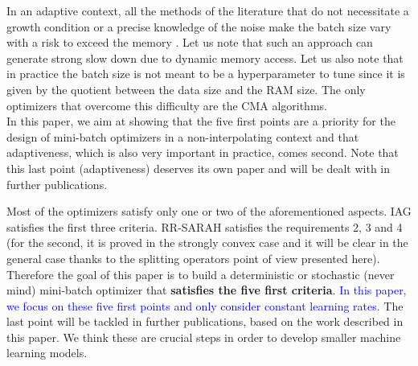 \documentclass[article,authoryear,jmlmc]{beg_32}             %
\begin{document}
\begin{enumerate}
          In an adaptive context, all the methods of the literature that do
          not necessitate a growth condition or a precise knowledge of the noise make the batch size vary with a risk to exceed the memory
          \cite{armijo_batch_size,armijo_variance_reduction,sto_TR_sampling}. Let us note that such an approach can generate strong slow down due to dynamic memory access. Let us also note that in practice the batch size is not meant to be a hyperparameter to tune since it is given by the quotient between the data size and the RAM size. The only optimizers that overcome this difficulty are the CMA algorithms. \\
          In this paper, we aim at showing that the five first points are a priority for the design of mini-batch optimizers in a non-interpolating context 
          and that adaptiveness, which is also very important in practice, comes second. 
          Note that this last point (adaptiveness) deserves its own paper and will be dealt with in further publications. %
\end{enumerate}
Most of the optimizers satisfy only one or two of the aforementioned aspects. IAG satisfies the first three criteria. RR-SARAH satisfies the requirements 2, 3 and 4 (for the
second, it is proved in the strongly convex case and it will be clear in the general case thanks to the splitting operators point of view presented here). 
Therefore the goal of this paper %
is to build a deterministic or stochastic (never mind) mini-batch optimizer that \textbf{satisfies the five first
criteria}. \textcolor{blue}{In this paper, we focus on these five first points and only consider constant learning rates}. The last point will be tackled in further publications, based on the work described in this paper. We think these are crucial steps in order to develop smaller machine learning models.\\ 
\end{document}
